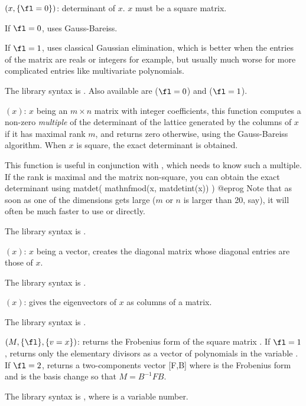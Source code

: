 $(x,\{\fl=0\})$: \label{se:matdet}determinant of $x$. $x$ must be a square matrix.

If $\fl=0$, uses Gauss-Bareiss.

If $\fl=1$, uses classical Gaussian elimination, which is better when the
entries of the matrix are reals or integers for example, but usually much
worse for more complicated entries like multivariate polynomials.

The library syntax is .
Also available are  ($\fl=0$) and
 ($\fl=1$).

$(x)$: \label{se:matdetint}
$x$ being an $m\times n$ matrix with integer
coefficients, this function computes a non-zero \emph{multiple} of the
determinant of
the lattice generated by the columns of $x$ if it has maximal rank $m$, and
returns zero otherwise, using the Gauss-Bareiss algorithm. When $x$ is square,
the exact determinant is obtained.

This function is useful in conjunction with , which needs to
know such a multiple. If the rank is maximal and the matrix non-square,
you can obtain the exact determinant using
\bprog
  matdet( mathnfmod(x, matdetint(x)) )
@eprog\noindent
Note that as soon as one of the dimensions gets large ($m$ or $n$ is larger
than 20, say), it will often be much faster to use  or
 directly.

The library syntax is .

$(x)$: \label{se:matdiagonal}$x$ being a vector, creates the diagonal matrix
whose diagonal entries are those of $x$.

The library syntax is .

$(x)$: \label{se:mateigen}gives the eigenvectors of $x$ as columns of a matrix.

The library syntax is .

$(M,\{\fl\},\{v=x\})$: \label{se:matfrobenius}returns the Frobenius form of
the square matrix . If $\fl=1$, returns only the elementary divisors as
a vector of polynomials in the variable .  If $\fl=2$, returns a
two-components vector [F,B] where  is the Frobenius form and  is
the basis change so that $M=B^{-1}FB$.

The library syntax is , where  is a variable number.

